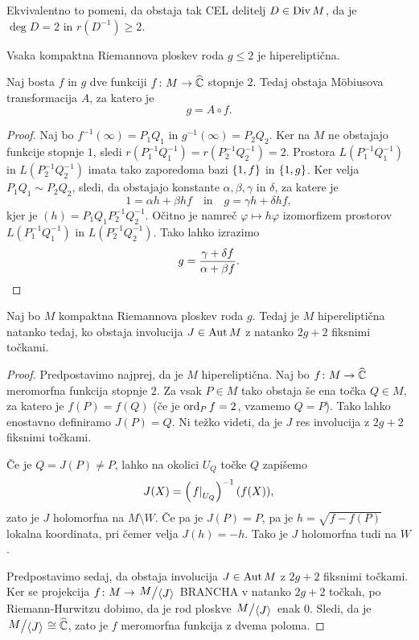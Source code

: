 Ekvivalentno to pomeni, da obstaja tak CEL delitelj
$D \in \operatorname{Div} M$, da je $\deg D = 2$ in $r(D^{-1}) \geq 2$.

\begin{trditev}
Vsaka kompaktna Riemannova ploskev roda $g \leq 2$ je
hipereliptična.
\end{trditev}


\begin{trditev}
Naj bosta $f$ in $g$ dve funkciji $f \colon M \to \widehat{\mathbb{C}}$ stopnje
$2$. Tedaj obstaja Möbiusova transformacija $A$, za katero je
\[
g = A \circ f.
\]
\end{trditev}

\begin{proof}
Naj bo $f^{-1}(\infty) = P_1 Q_1$ in $g^{-1}(\infty) = P_2 Q_2$.
Ker na $M$ ne obstajajo funkcije stopnje $1$, sledi
$r(P_1^{-1} Q_1^{-1}) = r(P_2^{-1} Q_2^{-1}) = 2$. Prostora
$L(P_1^{-1} Q_1^{-1})$ in $L(P_2^{-1} Q_2^{-1})$ imata tako
zaporedoma bazi $\left\{1, f\right\}$ in $\left\{1, g\right\}$. Ker velja
$P_1 Q_1 \sim P_2 Q_2$,
sledi, da obstajajo konstante $\alpha, \beta, \gamma$ in $\delta$,
za katere je
\[
1 = \alpha h + \beta hf
\quad \text{in} \quad
g = \gamma h + \delta hf,
\]
kjer je $(h) = P_1 Q_1 P_2^{-1} Q_2^{-1}$. Očitno je namreč
$\varphi \mapsto h \varphi$ izomorfizem prostorov
$L(P_1^{-1} Q_1^{-1})$ in $L(P_2^{-1} Q_2^{-1})$. Tako lahko
izrazimo
\[
g = \frac{\gamma + \delta f}{\alpha + \beta f}. \qedhere
\]
\end{proof}

\begin{trditev}
Naj bo $M$ kompaktna Riemannova ploskev roda $g$. Tedaj je $M$
hipereliptična natanko tedaj, ko obstaja involucija $J \in \operatorname{Aut} M$
z natanko $2g + 2$ fiksnimi točkami.
\end{trditev}

\begin{proof}
Predpostavimo najprej, da je $M$ hipereliptična. Naj bo
$f \colon M \to \widehat{\mathbb{C}}$ meromorfna funkcija stopnje $2$. Za vsak
$P \in M$ tako obstaja še ena točka $Q \in M$, za katero je
$f(P) = f(Q)$ (če je $\operatorname{ord}_P f = 2$, vzamemo $Q=P$). Tako lahko
enostavno definiramo $J(P) = Q$. Ni težko videti, da je $J$
res involucija z $2g + 2$ fiksnimi točkami.

Če je $Q = J(P) \ne P$, lahko na okolici $U_Q$ točke $Q$ zapišemo
\[
J(X) = \left(\left. f\right|_{U_Q}^{}\right)^{-1}(f(X)),
\]
zato je $J$ holomorfna na $M \setminus W$. Če pa je $J(P) = P$, pa
je $h = \sqrt{f - f(P)}$ lokalna koordinata, pri čemer velja
$J(h) = -h$. Tako je $J$ holomorfna tudi na $W$.

Predpostavimo sedaj, da obstaja involucija $J \in \operatorname{Aut} M$ z
$2g + 2$ fiksnimi točkami. Ker se projekcija
$f \colon M \to \kvoc{M}{\skl{J}}$ BRANCHA v natanko $2g + 2$
točkah, po Riemann-Hurwitzu dobimo, da je rod ploskve
$\kvoc{M}{\skl{J}}$ enak $0$. Sledi, da je
$\kvoc{M}{\skl{J}} \cong \rs$, zato je $f$ meromorfna funkcija z
dvema poloma.
\end{proof}

